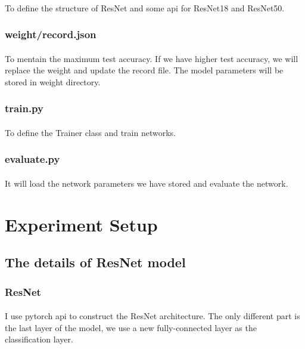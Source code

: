 \paragraph{}
To define the structure of ResNet and some api for ResNet18 and ResNet50.
\subsubsection{weight/record.json}
\paragraph{}
To mentain the maximum test accuracy. If we have higher test accuracy, we will replace the weight and update the record file. The model parameters will be stored in weight directory.
\subsubsection{train.py}
\paragraph{}
To define the Trainer class and train networks.
\subsubsection{evaluate.py}
\paragraph{}
It will load the network parameters we have stored and evaluate the network.
\section{Experiment Setup}
\subsection{The details of ResNet model}
\subsubsection{ResNet}
\paragraph{}
I use pytorch api to construct the ResNet architecture. The only different part is the last layer of the model, we use a new fully-connected layer as the classification layer.
